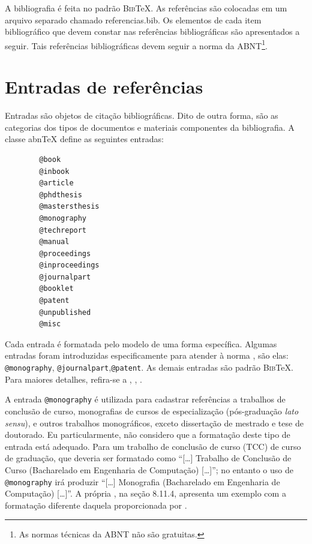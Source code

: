 \begin{apendicesenv}
    A bibliografia é feita no padrão \textsc{Bib}\TeX{}.
    As referências são colocadas em um arquivo separado chamado {\color{red} referencias.bib}.
    Os elementos de cada item bibliográfico que devem constar nas referências bibliográficas são apresentados a seguir.
    Tais referências bibliográficas devem seguir a norma  da ABNT\footnote{As normas técnicas da ABNT não são gratuitas.}.

    \section{Entradas de referências}
    \label{sec_entradas_de_referencias}

    Entradas são objetos de citação bibliográficas.
    Dito de outra forma, são as categorias dos tipos de documentos e materiais componentes da bibliografia.
    A classe abn\TeX{} define as seguintes entradas:

    \begin{verbatim}
        @book
        @inbook
        @article
        @phdthesis
        @mastersthesis
        @monography
        @techreport
        @manual
        @proceedings
        @inproceedings
        @journalpart
        @booklet
        @patent
        @unpublished
        @misc
    \end{verbatim}

    Cada entrada é formatada pelo modelo de uma forma específica.
    Algumas entradas foram introduzidas especificamente para atender à norma , são elas: \verb|@monography|, \verb|@journalpart|,\verb|@patent|.
    As demais entradas são padrão \textsc{Bib}\TeX{}.
    Para maiores detalhes, refira-se a , , .

    A entrada \verb|@monography| é utilizada para cadastrar referências a trabalhos de conclusão de curso, monografias de cursos de especialização (pós-graduação \textit{lato sensu}), e outros trabalhos monográficos, exceto dissertação de mestrado e tese de doutorado.
    Eu particularmente, não considero que a formatação deste tipo de entrada está adequado.
    Para um trabalho de conclusão de curso (TCC) de curso de graduação, que deveria ser formatado como ``[\ldots] Trabalho de Conclusão de Curso (Bacharelado em Engenharia de Computação) [\ldots]''; no entanto o uso de \verb|@monography| irá produzir ``[\ldots] Monografia (Bacharelado em Engenharia de Computação) [\ldots]''.
    A própria  , na seção 8.11.4, apresenta um exemplo com a formatação diferente daquela proporcionada por .


\end{apendicesenv}
